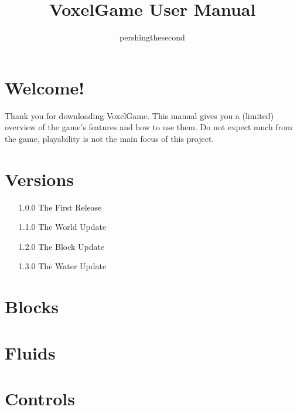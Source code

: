 \documentclass{article}
\begin{document}
    \title{VoxelGame User Manual}
    \author{pershingthesecond}

    \maketitle
    \newpage

    \tableofcontents
    \newpage


    \section{Welcome!}\label{sec:welcome!}

    Thank you for downloading VoxelGame.
    This manual gives you a (limited) overview of the game's features and how to use them.
    Do not expect much from the game, playability is not the main focus of this project.


    \section{Versions}\label{sec:versions}

    \begin{enumerate}
        \item[1.0.0] The First Release
        \item[1.1.0] The World Update
        \item[1.2.0] The Block Update
        \item[1.3.0] The Water Update
    \end{enumerate}


    \section{Blocks}\label{sec:blocks}

    


    \section{Fluids}\label{sec:fluids}

    


    \section{Controls}\label{sec:controls}

    
\end{document}
